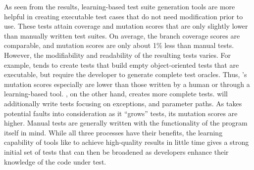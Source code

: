 As seen from the results, learning-based test suite generation tools are more helpful in creating executable test cases that do not need modification prior to use.  These tests attain coverage and mutation scores that are only slightly lower than manually written test suites.  On average, the branch coverage scores are comparable, and mutation scores are only about 1\% less than manual tests.  However, the modifiability and readability of the resulting tests varies.  For example, \codepro tends to create tests that build empty object-oriented tests that are executable, but require the developer to generate complete test oracles.  Thus, \codepro's mutation scores especially are lower than those written by a human or through a learning-based tool.  \evo, on the other hand, creates more complete tests.  \evo will additionally write tests focusing on exceptions, and parameter paths.  As \evo takes potential faults into consideration as it ``grows'' tests, its mutation scores are higher.  Manual tests are generally written with the functionality of the program itself in mind.  While all three processes have their benefits, the learning capability of tools like \evo to achieve high-quality results in little time gives a strong initial set of tests that can then be broadened as developers enhance their knowledge of the code under test.

